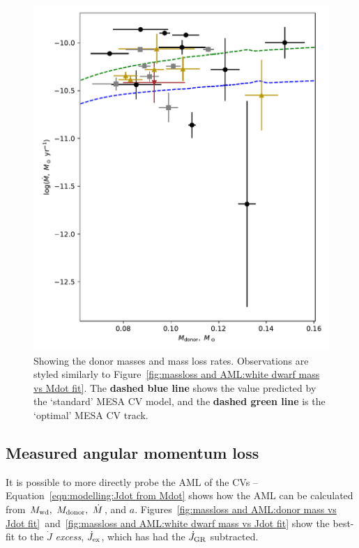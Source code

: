 \begin{figure}
    \centering
    \includegraphics[width=\textwidth]{figures/results/Mdot/Mr_Mdot_nofit.pdf}
    \caption{Showing the donor masses and mass loss rates. Observations are styled similarly to Figure~\ref{fig:massloss and AML:white dwarf mass vs Mdot fit}. The {\bf dashed blue line} shows the value predicted by the `standard' MESA CV model, and the {\bf dashed green line} is the `optimal' MESA CV track.}
    \label{fig:massloss and AML:donor mass vs Mdot fit}
\end{figure}



\newpage
\subsection{Measured angular momentum loss}

It is possible to more directly probe the AML of the CVs -- Equation~\ref{eqn:modelling:Jdot from Mdot} shows how the AML can be calculated from $M_{\rm wd},\ M_{\rm donor},\ \dot M$, and $a$.
Figures~\ref{fig:massloss and AML:donor mass vs Jdot fit}~and~\ref{fig:massloss and AML:white dwarf mass vs Jdot fit} show the best-fit to the $\dot J$ \textit{excess}, $\dot J_{\rm ex}$, which has had the $\dot J_{\rm GR}$ subtracted.


